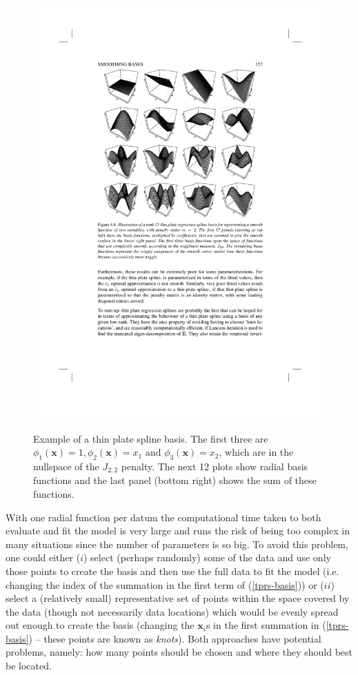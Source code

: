 \begin{figure}[p]
\centering
\includegraphics[width=6in]{intro/figs/tprs-basis.pdf}\\
\caption{Example of a thin plate spline basis. The first three are $\phi_1(\mathbf{x})=1, \phi_2(\mathbf{x})=x_1 \text{ and } \phi_3(\mathbf{x})=x_2$, which are in the nullspace of the $J_{2,2}$ penalty. The next 12 plots show radial basis functions and the last panel (bottom right) shows the sum of these functions.}
\label{tprs-basis-fig}
\end{figure}

With one radial function per datum the computational time taken to both evaluate and fit the model is very large and runs the risk of being too complex in many situations since the number of parameters is so big. To avoid this problem, one could either ($i$) select (perhaps randomly) some of the data and use only those points to create the basis and then use the full data to fit the model (i.e. changing the index of the summation in the first term of (\ref{tprs-basis})) or ($ii$) select a (relatively small) representative set of points within the space covered by the data (though not necessarily data locations) which would be evenly spread out enough to create the basis (changing the $\mathbf{x}_i$s in the first summation in (\ref{tprs-basis}) -- these points are known as \textit{knots}). Both approaches have potential problems, namely: how many points should be chosen and where they should best be located.


